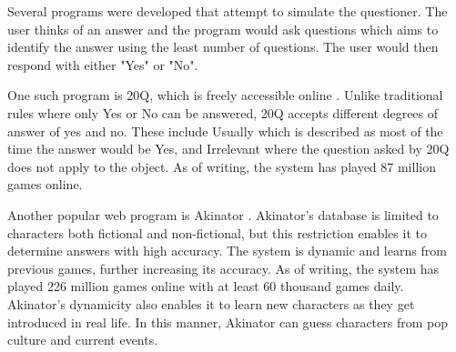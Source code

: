 Several programs were developed that attempt to simulate the questioner. 
The user thinks of an answer and the program would ask questions which aims to identify the answer using the least number of questions. The user would then respond with either "Yes" or "No".

One such program is 20Q, which is freely accessible online \cite{20q:2016}. 
Unlike traditional rules where only Yes or No can be answered, 20Q accepts different degrees of answer of yes and no.
These include Usually which is described as most of the time the answer would be Yes, and Irrelevant where the question asked by 20Q does not apply to the object.
As of writing, the system has played 87 million games online.

Another popular web program is Akinator \cite{Akinator:2016}.
Akinator's database is limited to characters both fictional and non-fictional, but this restriction enables it to determine answers with high accuracy.
The system is dynamic and learns from previous games, further increasing its accuracy.
As of writing, the system has played 226 million games online with at least 60 thousand games daily.
Akinator's dynamicity also enables it to learn new characters as they get introduced in real life.
In this manner, Akinator can guess characters from pop culture and current events.
